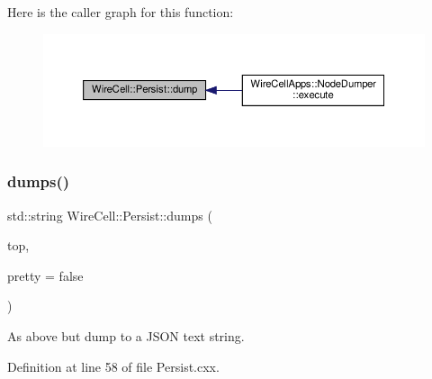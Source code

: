 Here is the caller graph for this function\+:
\nopagebreak
\begin{figure}[H]
\begin{center}
\leavevmode
\includegraphics[width=350pt]{namespace_wire_cell_1_1_persist_a2acf48c85b54dfa84e3a42b610cdf780_icgraph}
\end{center}
\end{figure}
\mbox{\label{namespace_wire_cell_1_1_persist_aaaf7c0173c5331a2c4f675e8d077abf9}} 
\subsubsection{\texorpdfstring{dumps()}{dumps()}}
{\footnotesize\ttfamily std\+::string Wire\+Cell\+::\+Persist\+::dumps (\begin{DoxyParamCaption}\item[{const Json\+::\+Value \&}]{top,  }\item[{bool}]{pretty = {\ttfamily false} }\end{DoxyParamCaption})}



As above but dump to a J\+S\+ON text string. 



Definition at line 58 of file Persist.\+cxx.

\mbox{\label{namespace_wire_cell_1_1_persist_ab70e06414625bf66f10b20dd41112697}} 
